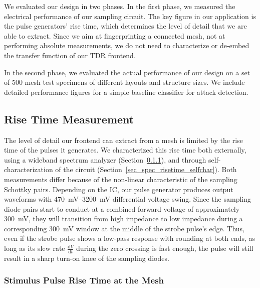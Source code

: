 \documentclass[final]{iacrtrans}
\begin{document}
We evaluated our design in two phases. In the first phase, we measured the electrical performance of our sampling
circuit. The key figure in our application is the pulse generators' rise time, which determines the level of detail that
we are able to extract. Since we aim at fingerprinting a connected mesh, not at performing absolute measurements, we do
not need to characterize or de-embed the transfer function of our TDR frontend.

In the second phase, we evaluated the actual performance of our design on a set of 500 mesh test specimens of different
layouts and structure sizes. We include detailed performance figures for a simple baseline classifier for attack
detection.

\subsection{Rise Time Measurement}

The level of detail our frontend can extract from a mesh is limited by the rise time of the pulses it generates. We
characterized this rise time both externally, using a wideband spectrum analyzer (Section~\ref{sec_spec_risetime}), and
through self-characterization of the circuit (Section~\ref{sec_spec_risetime_selfchar}). Both measurements differ
because of the non-linear characteristic of the sampling Schottky pairs. Depending on the IC, our pulse generator
produces output waveforms with \qtyrange{470}{3200}{\milli\volt} differential voltage swing. Since the sampling diode
pairs start to conduct at a combined forward voltage of approximately \qty{300}{\milli\volt}, they will transition from
high impedance to low impedance during a corresponding \qty{300}{\milli\volt} window at the middle of the strobe pulse's
edge. Thus, even if the strobe pulse shows a low-pass response with rounding at both ends, as long as its slew rate
$\frac{\mathrm{d}V}{\mathrm{d}t}$ during the zero crossing is fast enough, the pulse will still result in a sharp
turn-on knee of the sampling diodes.

\subsubsection{Stimulus Pulse Rise Time at the Mesh}
\label{sec_spec_risetime}
\end{document}

